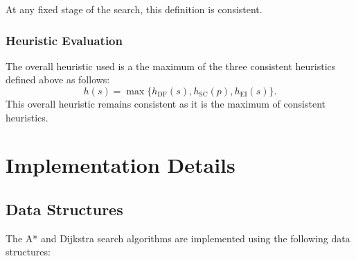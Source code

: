 \documentclass[11pt]{article}
\begin{document}
At any fixed stage of the search, this definition is consistent.

\subsubsection{Heuristic Evaluation}
The overall heuristic used is a the maximum of the three consistent heuristics defined above as follows:
\[
  h(s) = \max\{h_{\mathrm{DF}}(s), h_{\mathrm{SC}}(p), h_{\mathrm{EI}}(s)\}.
\]
This overall heuristic remains consistent as it is the maximum of consistent heuristics.

\section{Implementation Details}

\subsection{Data Structures}

The A* and Dijkstra search algorithms are implemented using the following data structures:
\end{document}
